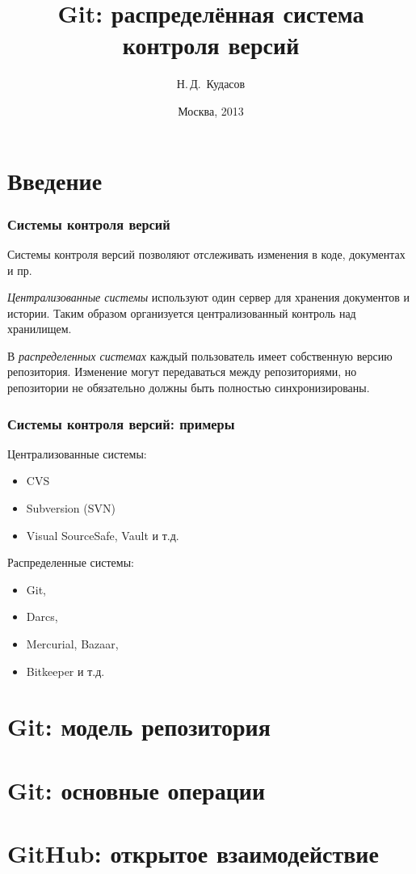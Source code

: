 \documentclass{beamer}
\begin{document}
\title[]{Git: распределённая система контроля версий}
\author{Н.\,Д.~Кудасов}
\date{Москва, 2013}

\begin{frame}
\addtocounter{framenumber}{-1}
\maketitle
\end{frame}

\section{Введение}

\begin{frame}
  \frametitle{Системы контроля версий}
  Системы контроля версий позволяют отслеживать изменения в коде, документах и пр.

  {\it Централизованные системы} используют один сервер для хранения документов и истории.
  Таким образом организуется централизованный контроль над хранилищем.

  В {\it распределенных системах} каждый пользователь имеет собственную версию репозитория.
  Изменение могут передаваться между репозиториями, но репозитории не обязательно должны быть
  полностью синхронизированы.
\end{frame}

\begin{frame}
  \frametitle{Системы контроля версий: примеры}
  Централизованные системы:
  \begin{itemize}
    \item CVS
    \item Subversion (SVN)
    \item Visual SourceSafe, Vault и т.д.
  \end{itemize}

  Распределенные системы:
  \begin{itemize}
    \item Git,
    \item Darcs,
    \item Mercurial, Bazaar,
    \item Bitkeeper и т.д.
  \end{itemize}
\end{frame}

\section{Git: модель репозитория}

\section{Git: основные операции}

\section{GitHub: открытое взаимодействие}
\end{document}
